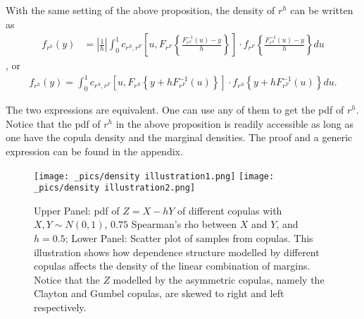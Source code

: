 \documentclass[11pt,a4paper,english]{article}
\begin{document}
\begin{proposition} With the same setting of the above proposition, the density of $r^h$ can be written as
  \begin{align}
  f_{r^h}(y) &= \left|\frac{1}{h}\right|\int_0^1 c_{r^S, r^F} \left[u,
  F_{r^F}\left\{\frac{F^{-1}_{r^S}(u)-y}{h}\right\}
  \right]
   \cdot
  f_{r^F}
  \left\{\frac{F^{-1}_{r^S}(u)-y}{h}\right\} du \label{eq:density1}
  \end{align}, or
    \begin{align}
      f_{r^h}(y)
      = \int_0^1 c_{r^S, r^F} \left[u,
      F_{r^S}\left\{y + h F^{-1}_{r^F}(u)\right\}
      \right]
       \cdot
      f_{r^S}
      \left\{
      y+ hF^{-1}_{r^F}(u)
      \right\} du.\label{eq:density2}
  \end{align}
  \end{proposition}
The two expressions are equivalent.
One can use any of them to get the pdf of $r^h$.
Notice that the pdf of $r^h$ in the above proposition is readily accessible as long as one have
the copula density and the marginal densities.
The proof and a generic expression can be found in the appendix.
\begin{figure}[h]
\texttt{[image: \_pics/density illustration1.png]}
\texttt{[image: \_pics/density illustration2.png]}
  \caption{Upper Panel: pdf of $Z= X - hY$ of different copulas with
  $X, Y \sim N(0,1)$,
  $0.75$ Spearman's rho between $X$ and $Y$, and $h=0.5$;
  Lower Panel: Scatter plot of samples from copulas.
  This illustration shows how dependence structure modelled by different copulas affects the density of the linear combination
  of margins.
  Notice that the $Z$ modelled by the asymmetric copulas, namely the Clayton and Gumbel copulas, are skewed to right
  and left respectively.}
\label{fig:density illustration}
\end{figure}
\end{document}

